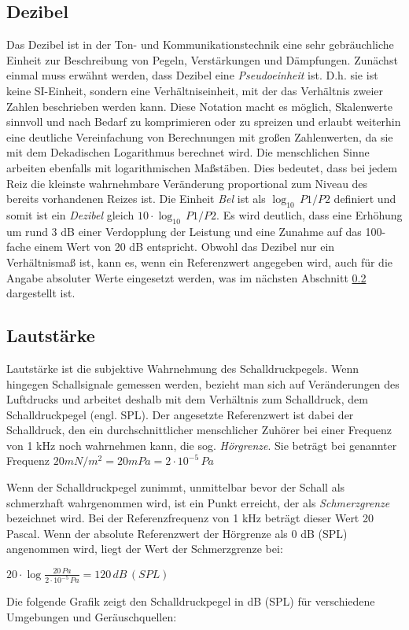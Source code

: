 \subsection{Dezibel} 
\label{sub:Dezibel}
Das Dezibel ist in der Ton- und Kommunikationstechnik eine sehr gebräuchliche Einheit zur Beschreibung von Pegeln, Verstärkungen und Dämpfungen. Zunächst einmal muss erwähnt werden, dass Dezibel eine \textit{Pseudoeinheit} ist. D.h. sie ist keine SI-Einheit, sondern eine Verhältniseinheit, mit der das Verhältnis zweier Zahlen beschrieben werden kann. Diese Notation macht es möglich, Skalenwerte sinnvoll und nach Bedarf zu komprimieren oder zu spreizen und erlaubt weiterhin eine deutliche Vereinfachung von Berechnungen mit großen Zahlenwerten, da sie mit dem Dekadischen Logarithmus berechnet wird.  Die menschlichen Sinne arbeiten ebenfalls mit logarithmischen Maßstäben. Dies bedeutet, dass bei jedem Reiz die kleinste wahrnehmbare Veränderung proportional zum Niveau des bereits vorhandenen Reizes ist. Die Einheit \textit{Bel} ist als ${\log_{10}\,P1/P2}$ definiert und somit ist ein \textit{Dezibel} gleich ${10\cdot\log_{10}\,P1/P2}$. Es wird deutlich, dass eine Erhöhung um rund 3 dB einer Verdopplung der Leistung und eine Zunahme auf das 100-fache einem Wert von 20 dB entspricht.
Obwohl das Dezibel nur ein Verhältnismaß ist, kann es, wenn ein Referenzwert angegeben wird, auch für die Angabe absoluter Werte eingesetzt werden, was im nächsten Abschnitt \ref{sub:Lautstaerke} dargestellt ist.

\subsection{Lautstärke} 
\label{sub:Lautstaerke}
Lautstärke ist die subjektive Wahrnehmung des Schalldruckpegels. Wenn hingegen Schallsignale gemessen werden, bezieht man sich auf Veränderungen des Luftdrucks und arbeitet deshalb mit dem Verhältnis zum Schalldruck, dem Schalldruckpegel (engl. SPL). Der angesetzte Referenzwert ist dabei der Schalldruck, den ein durchschnittlicher menschlicher Zuhörer bei einer Frequenz von 1 kHz noch wahrnehmen kann, die sog. \textit{Hörgrenze}. Sie beträgt bei genannter Frequenz ${20 mN/m^2 = 20 mPa = 2\cdot 10^{-5}\,Pa}$

Wenn der Schalldruckpegel zunimmt, unmittelbar bevor der Schall als schmerzhaft wahrgenommen wird, ist ein Punkt erreicht, der als \textit{Schmerzgrenze} bezeichnet wird. Bei der Referenzfrequenz von 1 kHz beträgt dieser Wert 20 Pascal. Wenn der absolute Referenzwert der Hörgrenze als 0 dB (SPL) angenommen wird, liegt der Wert der Schmerzgrenze bei:
\begin{center}
$20\cdot\log\frac{20\,Pa}{2\cdot 10^{-5}\,Pa} = 120\,dB\,(SPL)$
\end{center}
Die folgende Grafik zeigt den Schalldruckpegel in dB (SPL) für verschiedene Umgebungen und Geräuschquellen:

